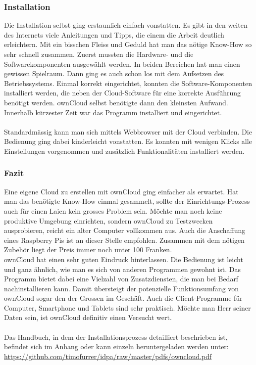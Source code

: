 \subsubsection{Installation}
Die Installation selbst ging erstaunlich einfach vonstatten. Es gibt in den weiten des Internets viele Anleitungen und Tipps, die einem die Arbeit deutlich erleichtern. Mit ein bisschen Fleiss und Geduld hat man das nötige Know-How so sehr schnell zusammen. Zuerst mussten die Hardware- und die Softwarekomponenten ausgewählt werden. In beiden Bereichen hat man einen gewissen Spielraum. Dann ging es auch schon los mit dem Aufsetzen des Betriebssystems. Einmal korrekt eingerichtet, konnten die Software-Komponenten installiert werden, die neben der Cloud-Software für eine korrekte Ausführung benötigt werden. ownCloud selbst benötigte dann den kleinsten Aufwand. Innerhalb kürzester Zeit war das Programm installiert und eingerichtet.
\\
\\
Standardmässig kann man sich mittels Webbrowser mit der Cloud verbinden. Die Bedienung ging dabei kinderleicht vonstatten. Es konnten mit wenigen Klicks alle Einstellungen vorgenommen und zusätzlich Funktionalitäten installiert werden.

\subsubsection{Fazit}
Eine eigene Cloud zu erstellen mit ownCloud ging einfacher als erwartet. Hat man das benötigte Know-How einmal gesammelt, sollte der Einrichtungs-Prozess auch für einen Laien kein grosses Problem sein. Möchte man noch keine produktive Umgebung einrichten, sondern ownCloud zu Testzwecken ausprobieren, reicht ein alter Computer vollkommen aus. Auch die Anschaffung eines Raspberry Pis ist an dieser Stelle empfohlen. Zusammen mit dem nötigen Zubehör liegt der Preis immer noch unter 100 Franken.
\\
ownCloud hat einen sehr guten Eindruck hinterlassen. Die Bedienung ist leicht und ganz ähnlich, wie man es sich von anderen Programmen gewohnt ist. Das Programm bietet dabei eine Vielzahl von Zusatzdiensten, die man bei Bedarf nachinstallieren kann. Damit übersteigt der potenzielle Funktionsumfang von ownCloud sogar den der Grossen im Geschäft. Auch die Client-Programme für Computer, Smartphone und Tablets sind sehr praktisch.
Möchte man Herr seiner Daten sein, ist ownCloud definitiv einen Versucht wert.
\\ \\
Das Handbuch, in dem der Installationsprozess detailliert beschrieben ist, befindet sich im Anhang oder kann einzeln heruntergeladen werden unter: \url{https://github.com/timofurrer/idpa/raw/master/pdfs/owncloud.pdf}
